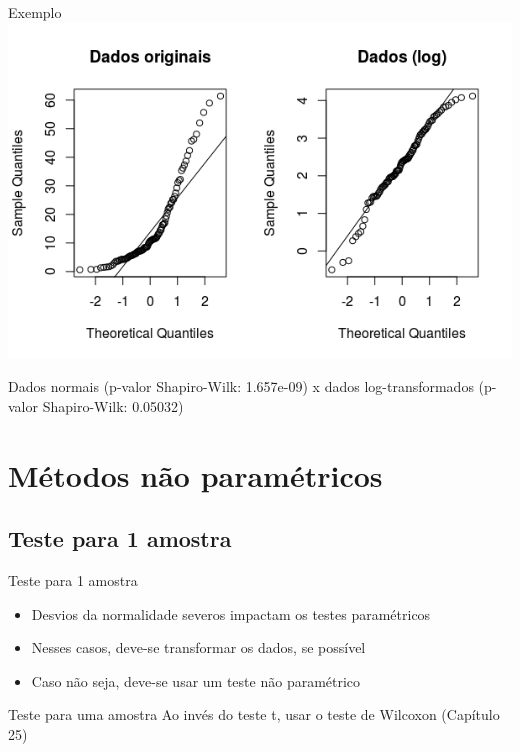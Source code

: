 \documentclass{beamer}
\begin{document}
\begin{frame}{Exemplo}
  \centering
  \includegraphics[width=\textwidth]{Cap37-38/transf-qq}

Dados normais (p-valor Shapiro-Wilk: 1.657e-09) x dados log-transformados (p-valor Shapiro-Wilk: 0.05032)
\end{frame}

\section{Métodos não paramétricos}

\subsection[1 amostra]{Teste para 1 amostra}

\begin{frame}{Teste para 1 amostra}
  \begin{itemize}
  \item Desvios da normalidade severos impactam os testes paramétricos
  \item Nesses casos, deve-se transformar os dados, se possível
  \item Caso não seja, deve-se usar um teste não paramétrico
  \end{itemize}
  \begin{block}{Teste para uma amostra}
    Ao invés do teste t, usar o teste de Wilcoxon (Capítulo 25)
  \end{block}
\end{frame}
\end{document}
